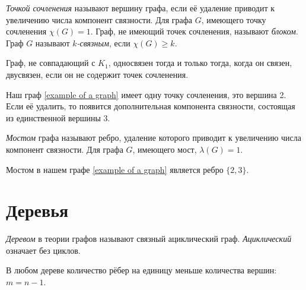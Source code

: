 \emph{Точкой сочленения} называют вершину графа, если её удаление приводит к 
увеличению числа компонент связности. Для графа $G$, имеющего точку сочленения 
$\chi(G)=1$. Граф, не имеющий точек сочленения, называют \emph{блоком}. Граф 
$G$ называют \emph{$k$-связным}, если $\chi(G)\geq k$.

Граф, не совпадающий с $K_1$, односвязен тогда и только тогда, когда он связен, 
двусвязен, если он не содержит точек сочленения.

Наш граф \ref{example of a graph} 
имеет одну точку сочленения, это вершина 2. Если её удалить, то появится 
дополнительная компонента связности, состоящая из единственной вершины 3.

\emph{Мостом} графа называют ребро, удаление которого приводит к увеличению 
числа компонент связности. Для графа $G$, имеющего мост, $\lambda(G)=1$.

Мостом в нашем графе \ref{example of a graph} является ребро $\{2,3\}$.

\section{Деревья}

\emph{Деревом} в теории графов называют связный ациклический граф. 
\emph{Ациклический} означает без циклов.

В любом дереве количество рёбер на единицу меньше количества вершин: $m=n-1$.

